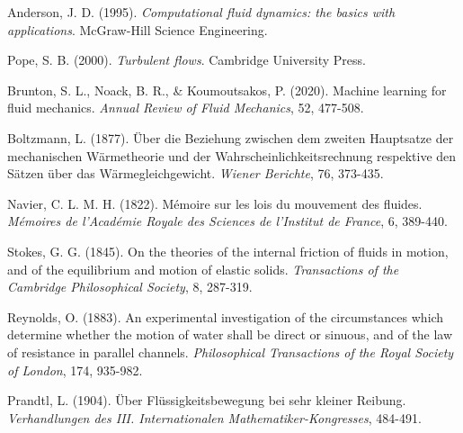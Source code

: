 \documentclass[12pt,a4paper]{article}
\begin{document}
\begin{thebibliography}{99}

Anderson, J. D. (1995). \textit{Computational fluid dynamics: the basics with applications}. McGraw-Hill Science Engineering.

Pope, S. B. (2000). \textit{Turbulent flows}. Cambridge University Press.

Brunton, S. L., Noack, B. R., \& Koumoutsakos, P. (2020). Machine learning for fluid mechanics. \textit{Annual Review of Fluid Mechanics}, 52, 477-508.

Boltzmann, L. (1877). Über die Beziehung zwischen dem zweiten Hauptsatze der mechanischen Wärmetheorie und der Wahrscheinlichkeitsrechnung respektive den Sätzen über das Wärmegleichgewicht. \textit{Wiener Berichte}, 76, 373-435.

Navier, C. L. M. H. (1822). Mémoire sur les lois du mouvement des fluides. \textit{Mémoires de l'Académie Royale des Sciences de l'Institut de France}, 6, 389-440.

Stokes, G. G. (1845). On the theories of the internal friction of fluids in motion, and of the equilibrium and motion of elastic solids. \textit{Transactions of the Cambridge Philosophical Society}, 8, 287-319.

Reynolds, O. (1883). An experimental investigation of the circumstances which determine whether the motion of water shall be direct or sinuous, and of the law of resistance in parallel channels. \textit{Philosophical Transactions of the Royal Society of London}, 174, 935-982.

Prandtl, L. (1904). Über Flüssigkeitsbewegung bei sehr kleiner Reibung. \textit{Verhandlungen des III. Internationalen Mathematiker-Kongresses}, 484-491.

\end{thebibliography}
\end{document}
